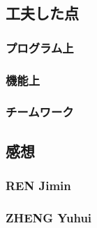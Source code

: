 \subsection{工夫した点}
	\subsubsection{プログラム上}
	\subsubsection{機能上}
	\subsubsection{チームワーク}
\subsection{感想}
	\subsubsection{REN Jimin}
	\subsubsection{ZHENG Yuhui}
